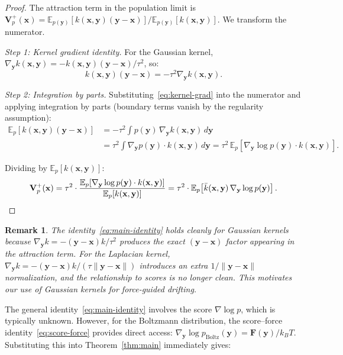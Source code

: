\documentclass[11pt]{article}
\newtheorem{remark}{Remark}[section]
\newcommand{\bx}{\mathbf{x}}
\newcommand{\by}{\mathbf{y}}
\newcommand{\bV}{\mathbf{V}}
\newcommand{\bF}{\mathbf{F}}
\newcommand{\E}{\mathbb{E}}
\newcommand{\kbar}{\bar{k}}
\newcommand{\pboltz}{p_{\text{Boltz}}}
\newcommand{\kBT}{k_BT}
\begin{document}
\begin{proof}
The attraction term in the population limit is
$\bV_p^+(\bx) = {\E_{p(\by)}[k(\bx,\by)(\by - \bx)]}/{\E_{p(\by)}[k(\bx,\by)]}$.
We transform the numerator.

\textit{Step 1: Kernel gradient identity.}
For the Gaussian kernel, $\nabla_\by k(\bx,\by) = -k(\bx,\by)(\by - \bx)/\tau^2$, so:
\begin{equation}
    k(\bx,\by)(\by - \bx) = -\tau^2 \nabla_\by k(\bx,\by).
    \label{eq:kernel-grad}
\end{equation}

\textit{Step 2: Integration by parts.}
Substituting~\eqref{eq:kernel-grad} into the numerator and applying integration by parts (boundary terms vanish by the regularity assumption):
\begin{align}
    \E_p[k(\bx,\by)(\by - \bx)]
    &= -\tau^2\int p(\by)\,\nabla_\by k(\bx,\by)\,d\by \nonumber \\
    &= \tau^2\int \nabla_\by p(\by) \cdot k(\bx,\by)\,d\by
    = \tau^2\,\E_p\!\left[\nabla_\by \log p(\by) \cdot k(\bx,\by)\right].
    \label{eq:ibp}
\end{align}

Dividing by $\E_p[k(\bx,\by)]$:
\begin{equation}
    \bV_p^+(\bx) = \tau^2 \cdot \frac{\E_p[\nabla_\by \log p(\by) \cdot k(\bx,\by)]}{\E_p[k(\bx,\by)]} = \tau^2 \cdot \E_p\!\left[\kbar(\bx,\by)\,\nabla_\by \log p(\by)\right]. \qedhere
\end{equation}
\end{proof}

\begin{remark}
\label{rem:gaussian-needed}
The identity~\eqref{eq:main-identity} holds cleanly for Gaussian kernels because $\nabla_\by k = -(\by-\bx)k/\tau^2$ produces the exact $(\by-\bx)$ factor appearing in the attraction term.
For the Laplacian kernel, $\nabla_\by k = -(\by-\bx)k/(\tau\|\by-\bx\|)$ introduces an extra $1/\|\by-\bx\|$ normalization, and the relationship to scores is no longer clean.
This motivates our use of Gaussian kernels for force-guided drifting.
\end{remark}

The general identity~\eqref{eq:main-identity} involves the score $\nabla \log p$, which is typically unknown.
However, for the Boltzmann distribution, the score--force identity~\eqref{eq:score-force} provides direct access: $\nabla_\by \log \pboltz(\by) = \bF(\by)/\kBT$.
Substituting this into Theorem~\ref{thm:main} immediately gives:
\end{document}
